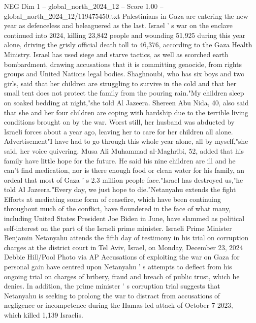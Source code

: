 \begin{textsample}{NEG Dim 1 – global\_north\_2024\_12 – Score 1.00 – global\_north\_2024\_12/119475450.txt}  \label{ex:f1_neg_196}
Palestinians in Gaza are entering the new year as defenceless and beleaguered as the last.
Israel ' s war on the enclave continued into 2024, killing 23,842 people and wounding 51,925 during this year alone, driving the grisly official death toll to 46,376, according to the Gaza Health Ministry.
Israel has used siege and starve tactics, as well as scorched earth bombardment, drawing accusations that it is committing genocide, from rights groups and United Nations legal bodies.
Shaghnoubi, who has six boys and two girls, said that her children are struggling to survive in the cold and that her small tent does not protect the family from the pouring rain."My children sleep on soaked bedding at night,"she told Al Jazeera.
Shereen Abu Nida, 40, also said that she and her four children are coping with hardship due to the terrible living conditions brought on by the war.
Worst still, her husband was abducted by Israeli forces about a year ago, leaving her to care for her children all alone.
Advertisement"I have had to go through this whole year alone, all by myself,"she said, her voice quivering.
Musa Ali Muhammad al-Maghribi, 52, added that his family have little hope for the future.
He said his nine children are ill and he can't find medication, nor is there enough food or clean water for his family, an ordeal that most of Gaza ' s 2.3 million people face."Israel has destroyed us,"he told Al Jazeera."Every day, we just hope to die."Netanyahu extends the fight Efforts at mediating some form of ceasefire, which have been continuing throughout much of the conflict, have floundered in the face of what many, including United States President Joe Biden in June, have slammed as political self-interest on the part of the Israeli prime minister.
Israeli Prime Minister Benjamin Netanyahu attends the fifth day of testimony in his trial on corruption charges at the district court in Tel Aviv, Israel, on Monday, December 23, 2024 Debbie Hill/Pool Photo via AP Accusations of exploiting the war on Gaza for personal gain have centred upon Netanyahu ' s attempts to deflect from his ongoing trial on charges of bribery, fraud and breach of public trust, which he denies.
In addition, the prime minister ' s corruption trial suggests that Netanyahu is seeking to prolong the war to distract from accusations of negligence or incompetence during the Hamas-led attack of October 7 2023, which killed 1,139 Israelis.

\end{textsample}
